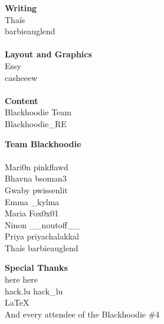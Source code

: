 \begin{multicols}{3}\footnotesize
\setlength{\columnseprule}{0pt}
\begin{center}
\textbf{Writing}\\
Tha\'is\\
\faTwitter \hspace{0.05cm} barbieauglend\\
~\\
\textbf{Layout and Graphics}\\
Essy\\
\faTwitter \hspace{0.05cm} casheeew\\
~\\
\textbf{Content}\\
Blackhoodie Team\\
\faTwitter \hspace{0.05cm} Blackhoodie\_RE\\
\end{center}
\columnbreak
\begin{center}
\textbf{Team Blackhoodie}\\
~\\
Mari0n \hspace{0.05cm} \faTwitter \hspace{0.05cm} pinkflawd\\
Bhavna \hspace{0.05cm} \faTwitter \hspace{0.05cm} bsoman3\\
Gwaby \hspace{0.05cm} \faTwitter \hspace{0.05cm} pwissenlit\\
Emma \hspace{0.05cm} \faTwitter \hspace{0.05cm} \_kylma\\
Maria \hspace{0.05cm} \faTwitter \hspace{0.05cm} Fox0x01\\
Ninon \hspace{0.05cm} \faTwitter \hspace{0.05cm} \_\_noutoff\_\_\\
Priya \hspace{0.05cm} \faTwitter \hspace{0.05cm} priyachalakkal\\
Tha\'is \hspace{0.05cm} \faTwitter \hspace{0.05cm} barbieauglend\\
\end{center}
\columnbreak
\begin{center}
\textbf{Special Thanks}\\
here \hspace{0.05cm} \faTwitter \hspace{0.05cm} here\\
hack.lu \hspace{0.05cm} \faTwitter \hspace{0.05cm} hack\_lu\\
\LaTeX\\
And every attendee of the Blackhoodie \#4
\end{center}
\end{multicols}
\vspace{-6em}
